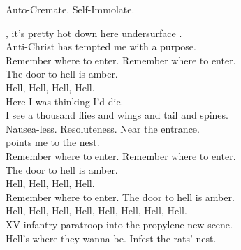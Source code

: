 Auto-Cremate. Self-Immolate. \\




, it's pretty hot down here undersurface .\\
Anti-Christ has tempted me with a purpose. \\

Remember where to enter. Remember where to enter. \\
The door to hell is amber. \\

Hell, Hell, Hell, Hell. \\

Here I was thinking I'd die. \\
I see a thousand flies and wings and tail and spines. \\
Nausea-less. Resoluteness. Near the entrance. \\
 points me to the  nest. \\

Remember where to enter. Remember where to enter. \\
The door to hell is amber. \\

Hell, Hell, Hell, Hell. \\

Remember where to enter. The door to hell is amber. \\

Hell, Hell, Hell, Hell, Hell, Hell, Hell, Hell. \\

XV infantry paratroop into the propylene new scene. \\
Hell's where they wanna be. Infest the rats' nest. \\
